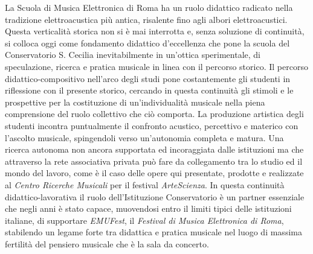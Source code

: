 \documentclass[
	a0,
	portrait
	]{a0poster}
\begin{document}
\noindent La Scuola di Musica Elettronica di Roma ha un ruolo didattico radicato nella tradizione elettroacustica più antica, risalente fino agli albori elettroacustici. Questa verticalità storica non si è mai interrotta e, senza soluzione di continuità, si colloca oggi come fondamento didattico d'eccellenza che pone la scuola del Conservatorio S. Cecilia inevitabilmente in un'ottica sperimentale, di speculazione, ricerca e pratica musicale in linea con il percorso storico. Il percorso didattico-compositivo nell'arco degli studi pone costantemente gli studenti in riflessione con il presente storico, cercando in questa continuità gli stimoli e le prospettive per la costituzione di un'individualità musicale nella piena comprensione del ruolo collettivo che ciò comporta. La produzione artistica degli studenti incontra puntualmente il confronto acustico, percettivo e materico con l'ascolto musicale, spingendoli verso un'autonomia completa e matura. Una ricerca autonoma non ancora supportata ed incoraggiata dalle istituzioni ma che attraverso la rete associativa privata può fare da collegamento tra lo studio ed il mondo del lavoro, come è il caso delle opere qui presentate, prodotte e realizzate al \emph{Centro Ricerche Musicali} per il festival \emph{ArteScienza}. In questa continuità didattico-lavorativa il ruolo dell'Istituzione Conservatorio è un partner essenziale che negli anni è stato capace, muovendosi entro il limiti tipici delle istituzioni italiane, di supportare \emph{EMUFest}, il \emph{Festival di Musica Elettronica di Roma}, stabilendo un legame forte tra didattica e pratica musicale nel luogo di massima fertilità del pensiero musicale che è la sala da concerto.

\normalsize

\end{document}
